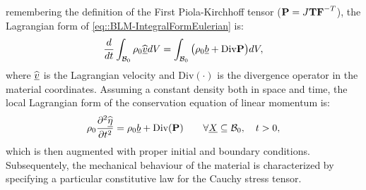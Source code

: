 remembering the definition of the First Piola-Kirchhoff tensor
($\textbf{P}=J\textbf{T}\textbf{F}^{-T}$), the Lagrangian form of
\eqref{eq::BLM-IntegralFormEulerian} is:
\begin{equation}
  \frac{d}{dt}\int_{\mathcal{B}_0}\rho_0\widehat{\underline{v}} dV =
  \int_{\mathcal{B}_0}\big(\rho_0\underline{b}+\text{Div}\textbf{P} \big)dV,
\end{equation}
where $\widehat{\underline{v}}$ is the Lagrangian velocity and
$\text{Div}(\cdot)$ is the divergence operator in the material
coordinates. Assuming a constant density both in space and time, the
local Lagrangian form of the conservation equation of linear momentum
is:
\begin{equation}
  \rho_0\frac{\partial^2\widehat{\underline{\eta}}}{\partial
    t^2}=\rho_0\underline{b}+\text{Div}(\textbf{P}) \qquad \forall \underline{X}
  \subseteq \mathcal{B}_0, \quad t>0,
  \label{eq::ConLinMom-Diff}
\end{equation}
which is then augmented with proper initial and boundary conditions.
Subsequentely, the mechanical behaviour of the material is characterized
by specifying a particular constitutive law for the Cauchy stress tensor.

